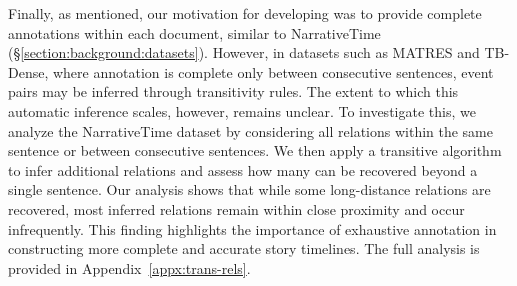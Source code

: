 

Finally, as mentioned, our motivation for developing \App{} was to provide complete annotations within each document, similar to NarrativeTime (§\ref{section:background:datasets}). However, in datasets such as MATRES and TB-Dense, where annotation is complete only between consecutive sentences, event pairs may be inferred through transitivity rules. The extent to which this automatic inference scales, however, remains unclear. To investigate this, we analyze the NarrativeTime dataset by considering all relations within the same sentence or between consecutive sentences. We then apply a transitive algorithm to infer additional relations and assess how many can be recovered beyond a single sentence. Our analysis shows that while some long-distance relations are recovered, most inferred relations remain within close proximity and occur infrequently. This finding highlights the importance of exhaustive annotation in constructing more complete and accurate story timelines. The full analysis is provided in Appendix~\ref{appx:trans-rels}.

